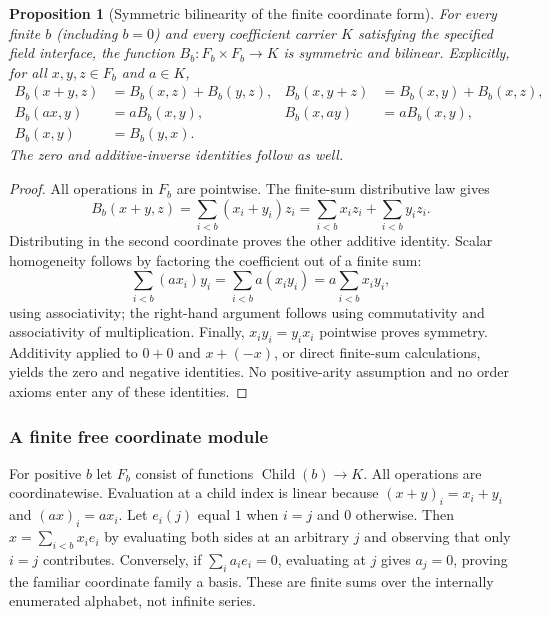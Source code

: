 \documentclass[11pt,reqno]{amsart}
\newtheorem{proposition}[theorem]{Proposition}
\theoremstyle{definition}\newtheorem{definition}[theorem]{Definition}
\theoremstyle{remark}\newtheorem{remark}[theorem]{Remark}
\newcommand{\Fin}{\operatorname{Child}}
\begin{document}
\begin{proposition}[Symmetric bilinearity of the finite coordinate form]\label{prop:bilinear}
For every finite $b$ (including $b=0$) and every coefficient carrier $K$ satisfying the specified field interface, the function $B_b:F_b\times F_b\to K$ is symmetric and bilinear. Explicitly, for all $x,y,z\in F_b$ and $a\in K$,
\begin{align*}
 B_b(x+y,z)&=B_b(x,z)+B_b(y,z),&
 B_b(x,y+z)&=B_b(x,y)+B_b(x,z),\\
 B_b(ax,y)&=aB_b(x,y),&
 B_b(x,ay)&=aB_b(x,y),\\
 B_b(x,y)&=B_b(y,x).
\end{align*}
The zero and additive-inverse identities follow as well.
\end{proposition}
\begin{proof}
All operations in $F_b$ are pointwise. The finite-sum distributive law gives
\[
 B_b(x+y,z)=\sum_{i<b}(x_i+y_i)z_i
 =\sum_{i<b}x_i z_i+\sum_{i<b}y_i z_i.
\]
Distributing in the second coordinate proves the other additive identity. Scalar homogeneity follows by factoring the coefficient out of a finite sum:
\[
 \sum_{i<b}(a x_i)y_i
 =\sum_{i<b}a(x_i y_i)
 =a\sum_{i<b}x_i y_i,
\]
using associativity; the right-hand argument follows using commutativity and associativity of multiplication. Finally, $x_i y_i=y_i x_i$ pointwise proves symmetry. Additivity applied to $0+0$ and $x+(-x)$, or direct finite-sum calculations, yields the zero and negative identities. No positive-arity assumption and no order axioms enter any of these identities.
\end{proof}


\medskip
\subsubsection*{A finite free coordinate module}\label{supp:8-1}
For positive $b$ let $F_b$ consist of functions $\Fin(b)\to K$. All operations are coordinatewise. Evaluation at a child index is linear because $(x+y)_i=x_i+y_i$ and $(ax)_i=ax_i$. Let $e_i(j)$ equal $1$ when $i=j$ and $0$ otherwise. Then $x=\sum_{i<b}x_ie_i$ by evaluating both sides at an arbitrary $j$ and observing that only $i=j$ contributes. Conversely, if $\sum_i a_ie_i=0$, evaluating at $j$ gives $a_j=0$, proving the familiar coordinate family a basis. These are finite sums over the internally enumerated alphabet, not infinite series.
\medskip
\medskip
\end{document}
